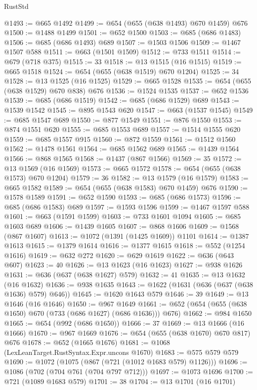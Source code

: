 \begin{lexlean}{RustStd}
\begin{coremodule}
@1493 := @665 @1492
@1499 := @654 (@655 (@638 @1493) @670 @1459) @676
@1500 := @1488 @1499
@1501 := @652 @1500
@1503 := @685 (@686 @1483)
@1506 := @685 (@686 @1493) @689
@1507 := @1503 @1506
@1509 := @1467 @1507 @588
@1511 := @663 (@1501 @1509)
@1512 := @733 @1511
@1514 := @679 (@718 @375)
@1515 := 33
@1518 := @13 @1515 (@16 @1515)
@1519 := @665 @1518
@1524 := @654 (@655 (@638 @1519) @670 @1204)
@1525 := 34
@1528 := @13 @1525 (@16 @1525)
@1529 := @665 @1528
@1535 := @654 (@655 (@638 @1529) @670 @838) @676
@1536 := @1524 @1535
@1537 := @652 @1536
@1539 := @685 (@686 @1519)
@1542 := @685 (@686 @1529) @689
@1543 := @1539 @1542
@1545 := @895 @1543 @620
@1547 := @663 (@1537 @1545)
@1549 := @685 @1547 @689
@1550 := @877 @1549
@1551 := @876 @1550
@1553 := @874 @1551 @620
@1555 := @685 @1553 @689
@1557 := @1514 @1555 @620
@1559 := @685 @1557 @915
@1560 := @872 @1559
@1561 := @1512 @1560
@1562 := @1478 @1561
@1564 := @685 @1562 @689
@1565 := @1439 @1564
@1566 := @868 @1565
@1568 := @1437 (@867 @1566)
@1569 := 35
@1572 := @13 @1569 (@16 @1569)
@1573 := @665 @1572
@1578 := @654 (@655 (@638 @1573) @670 @1204)
@1579 := 36
@1582 := @13 @1579 (@16 @1579)
@1583 := @665 @1582
@1589 := @654 (@655 (@638 @1583) @670 @1459) @676
@1590 := @1578 @1589
@1591 := @652 @1590
@1593 := @685 (@686 @1573)
@1596 := @685 (@686 @1583) @689
@1597 := @1593 @1596
@1599 := @1467 @1597 @588
@1601 := @663 (@1591 @1599)
@1603 := @733 @1601 @1094
@1605 := @685 @1603 @689
@1606 := @1439 @1605
@1607 := @868 @1606
@1609 := @1568 (@867 @1607)
@1613 := @1072 (@1391 (@1425 @1609)) @1101
@1614 := @1387 @1613
@1615 := @1379 @1614
@1616 := @1377 @1615
@1618 := @552 (@1254 @1616)
@1619 := @632 @272
@1620 := @629 @1619
@1622 := @636 (@643 @607)
@1623 := 40
@1626 := @13 @1623 (@16 @1623)
@1627 := @938 @1626
@1631 := @636 (@637 (@638 @1627) @579)
@1632 := 41
@1635 := @13 @1632 (@16 @1632)
@1636 := @938 @1635
@1643 := @1622 (@1631 (@636 (@637 (@638 @1636) @579) @646))
@1645 := @1620 @1643 @579
@1646 := 39
@1649 := @13 @1646 (@16 @1646)
@1650 := @967 @1649
@1661 := @652 (@654 (@655 (@638 @1650) @670 (@733 (@686 @1627) (@686 @1636))) @676)
@1662 := @984 @1650
@1665 := @654 (@992 (@686 @1650))
@1666 := 37
@1669 := @13 @1666 (@16 @1666)
@1670 := @967 @1669
@1676 := @654 (@655 (@638 @1670) @670 @817) @676
@1678 := @652 (@1665 @1676)
@1681 := @1068 (LexLeanTarget.RustSyntax.Expr.uncons @1670)
@1683 := @575 @579 @579
@1690 := @1072 (@1075 (@867 (@721 (@1012 @1683 @579) @1126)))
@1696 := @1086 (@702 (@704 @761 (@704 @797 @712)))
@1697 := @1073 @1696
@1700 := @721 (@1089 @1683 @579)
@1701 := 38
@1704 := @13 @1701 (@16 @1701)

\end{coremodule}
\end{lexlean}
